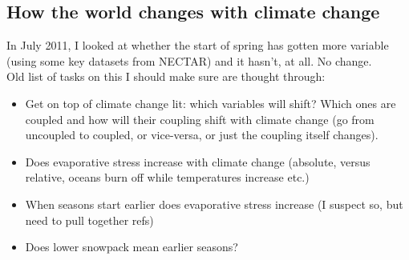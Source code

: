 \documentclass[11pt,a4paper,oneside]{article}
\begin{document}
\subsection{How the world changes with climate change}

\noindent In July 2011, I looked at whether the start of spring
has gotten more variable (using some key datasets from NECTAR) and it
hasn't, at all. No change.\\

\noindent Old list of tasks on this I should make sure are thought through:
\begin{itemize}
\item Get on top of climate change lit: which variables will shift?
  Which ones are coupled and how will their coupling shift with
  climate change (go from uncoupled to coupled, or vice-versa, or just
  the coupling itself changes). 
\item Does evaporative stress increase with climate change (absolute,
  versus relative, oceans burn off while temperatures increase etc.)
\item When seasons start earlier does evaporative stress increase (I
  suspect so, but need to pull together refs)
\item Does lower snowpack mean earlier seasons?
\end{itemize}
\end{document}
